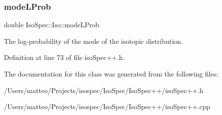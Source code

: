 \mbox{\label{class_iso_spec_1_1_iso_ab51c157b23ae6a6b521667b6f0e8a208}} 
\subsubsection{\texorpdfstring{mode\+L\+Prob}{modeLProb}}
{\footnotesize\ttfamily double Iso\+Spec\+::\+Iso\+::mode\+L\+Prob\hspace{0.3cm}{\ttfamily [protected]}}

The log-\/probability of the mode of the isotopic distribution. 

Definition at line 73 of file iso\+Spec++.\+h.



The documentation for this class was generated from the following files\+:\begin{DoxyCompactItemize}
\item 
/\+Users/matteo/\+Projects/isospec/\+Iso\+Spec/\+Iso\+Spec++/iso\+Spec++.\+h\item 
/\+Users/matteo/\+Projects/isospec/\+Iso\+Spec/\+Iso\+Spec++/iso\+Spec++.\+cpp\end{DoxyCompactItemize}
